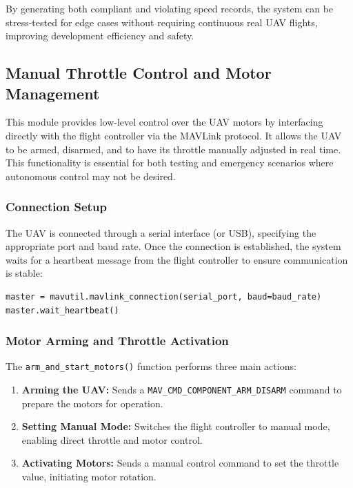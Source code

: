 By generating both compliant and violating speed records, the system can be stress-tested for edge cases without requiring continuous real UAV flights, improving development efficiency and safety.



\subsection{Manual Throttle Control and Motor Management}

This module provides low-level control over the UAV motors by interfacing directly with the flight controller via the MAVLink protocol. It allows the UAV to be armed, disarmed, and to have its throttle manually adjusted in real time. This functionality is essential for both testing and emergency scenarios where autonomous control may not be desired.

\subsubsection{Connection Setup}

The UAV is connected through a serial interface (or USB), specifying the appropriate port and baud rate. Once the connection is established, the system waits for a heartbeat message from the flight controller to ensure communication is stable:

\begin{verbatim}
master = mavutil.mavlink_connection(serial_port, baud=baud_rate)
master.wait_heartbeat()
\end{verbatim}

\subsubsection{Motor Arming and Throttle Activation}

The \texttt{arm\_and\_start\_motors()} function performs three main actions:

\begin{enumerate}
    \item \textbf{Arming the UAV:} Sends a \texttt{MAV\_CMD\_COMPONENT\_ARM\_DISARM} command to prepare the motors for operation.
    \item \textbf{Setting Manual Mode:} Switches the flight controller to manual mode, enabling direct throttle and motor control.
    \item \textbf{Activating Motors:} Sends a manual control command to set the throttle value, initiating motor rotation.
\end{enumerate}


